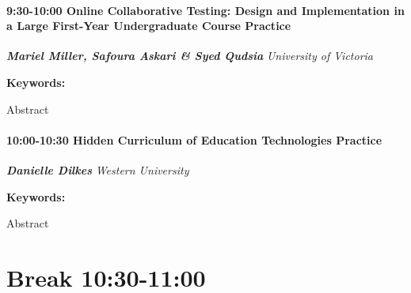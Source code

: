 \documentclass[
]{book}
\begin{document}
\begin{session}
\hypertarget{online-collaborative-testing-design-and-implementation-in-a-large-first-year-undergraduate-course-practice}{%
\paragraph*{\texorpdfstring{9:30-10:00 \textbar{} \textbf{Online
Collaborative Testing: Design and Implementation in a Large First-Year
Undergraduate Course} \textbar{}
Practice}{9:30-10:00 \textbar{} Online Collaborative Testing: Design and Implementation in a Large First-Year Undergraduate Course \textbar{} Practice}}\label{online-collaborative-testing-design-and-implementation-in-a-large-first-year-undergraduate-course-practice}}

\textbf{\emph{Mariel Miller, Safoura Askari \& Syed Qudsia}} \textbar{}
\emph{University of Victoria}

\textbf{Keywords:}

Abstract
\end{session}

\begin{session}
\hypertarget{hidden-curriculum-of-education-technologies-practice}{%
\paragraph*{\texorpdfstring{10:00-10:30 \textbar{} \textbf{Hidden
Curriculum of Education Technologies} \textbar{}
Practice}{10:00-10:30 \textbar{} Hidden Curriculum of Education Technologies \textbar{} Practice}}\label{hidden-curriculum-of-education-technologies-practice}}

\textbf{\emph{Danielle Dilkes}} \textbar{} \emph{Western University}

\textbf{Keywords:}

Abstract
\end{session}

\hypertarget{break-1030-1100-2}{%
\section*{Break \textbar{} 10:30-11:00}\label{break-1030-1100-2}}
\end{document}
